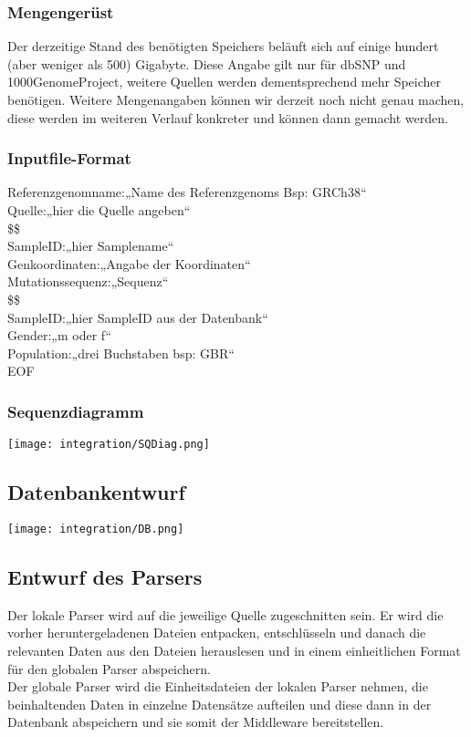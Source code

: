 \subsubsection{Mengengerüst}
Der derzeitige Stand des benötigten Speichers beläuft sich auf einige hundert (aber weniger als 500) Gigabyte. Diese Angabe gilt nur für dbSNP und 1000GenomeProject, weitere Quellen werden dementsprechend mehr Speicher benötigen. Weitere Mengenangaben können wir derzeit noch nicht genau machen, diese werden im weiteren Verlauf konkreter und können dann gemacht werden.
\subsubsection{Inputfile-Format}
Referenzgenomname:„Name des Referenzgenoms Bsp: GRCh38“\\
Quelle:„hier die Quelle angeben“\\
\$\$\\
SampleID:„hier Samplename“\\
Genkoordinaten:„Angabe der Koordinaten“ \\
Mutationssequenz:„Sequenz“\\
\$\$\\
SampleID:„hier SampleID aus der Datenbank“\\
Gender:„m oder f“\\
Population:„drei Buchstaben bsp: GBR“ \\
EOF\\
\subsubsection{Sequenzdiagramm}
\texttt{[image: integration/SQDiag.png]}
\subsection{Datenbankentwurf}
\texttt{[image: integration/DB.png]}
\subsection{Entwurf des Parsers}
Der lokale Parser wird auf die jeweilige Quelle zugeschnitten sein. Er wird die vorher heruntergeladenen Dateien entpacken, entschlüsseln und danach die relevanten Daten aus den Dateien herauslesen und in einem einheitlichen Format für den globalen Parser abspeichern.\\
Der globale Parser wird die Einheitsdateien der lokalen Parser nehmen, die beinhaltenden Daten in einzelne Datensätze aufteilen und diese dann in der Datenbank abspeichern und sie somit der Middleware bereitstellen.
